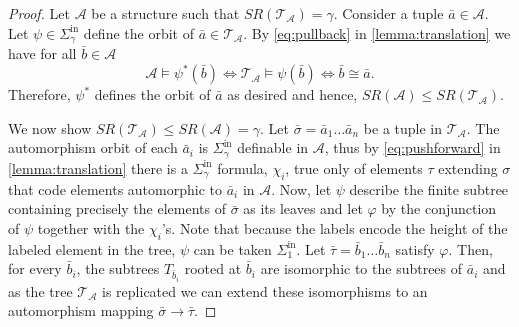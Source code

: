 \documentclass[10pt,a4paper]{amsart}
\renewcommand{\phi}{\varphi}
\providecommand{\A}{\mathcal{A}}
\providecommand{\Sinf}[1]{\Sigma^{\mathrm{in}}_{#1}}
\providecommand{\ba}{\bar a}
\providecommand{\bb}{\bar b}
\newcommand{\T}{{\mathcal{T}}}
\newcommand{\SR}{SR}
\begin{document}
\begin{proof}
Let $\A$ be a structure such that $SR(\T_\A)=\gamma$. Consider a tuple $\ba\in \A$. Let
$\psi\in\Sinf{\gamma}$ define the orbit of $\ba\in \T_\A$. By \cref{eq:pullback}
in \cref{lemma:translation} we have for all $\bb\in \A$ \[\A\models
\psi^*(\bb)\iff \T_\A\models \psi(\bb) \iff \bb\cong \ba.\] Therefore, $\psi^*$
defines the orbit of $\ba$ as desired and hence, $\SR(\A)\leq\SR(\T_\A)$. 

We now show $\SR(\T_\A)\leq\SR(\A)=\gamma$. Let $\bar\sigma=\ba_1\dots\ba_n$ be
a tuple in $\T_\A$. The automorphism orbit of each  $\ba_i$ is $\Sinf{\gamma}$
definable in $\A$, thus by \cref{eq:pushforward} in \cref{lemma:translation}
there is a $\Sinf{\gamma}$ formula, $\chi_i$,  true only of elements $\tau$ extending $\sigma$ 
that code elements automorphic to $\ba_i$ in $\A$. Now, let
$\psi$ describe the finite subtree containing precisely the elements of
$\bar\sigma$ as its leaves and let $\phi$ by the conjunction of $\psi$ together
with the $\chi_i$'s. Note that
because the labels encode the height of the labeled element in the tree, $\psi$
can be taken $\Sinf{1}$. Let $\bar \tau=\bb_1\dots\bb_n$ satisfy $\phi$. Then,
for every $\bb_i$, the subtrees $T_{\bb_i}$ rooted at $\bb_i$ are isomorphic to
the subtrees of $\ba_i$ and as the tree $\T_\A$ is replicated we can extend
these isomorphisms to an automorphism mapping $\bar\sigma\to \bar\tau$.
\end{proof}
\end{document}
